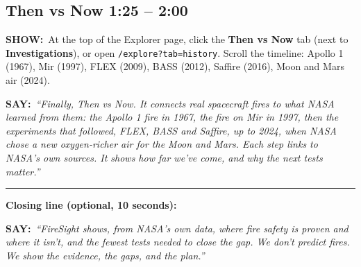 \documentclass[11pt,a4paper]{article}
\newcommand{\showit}[1]{\par\textbf{\color{showc}SHOW:}\ #1\par}
\newcommand{\sayit}[1]{\par\textbf{\color{sayc}SAY:}\ \textit{``#1''}\par\medskip}
\newcommand{\step}[2]{\subsection{#1 \hfill\normalsize\color{muted}#2}}
\begin{document}
\step{Then vs Now}{1:25 -- 2:00}
\showit{At the top of the Explorer page, click the \textbf{Then vs Now} tab (next to \textbf{Investigations}), or open \texttt{/explore?tab=history}. Scroll the timeline: Apollo 1 (1967), Mir (1997), FLEX (2009), BASS (2012), Saffire (2016), Moon and Mars air (2024).}
\sayit{Finally, Then vs Now. It connects real spacecraft fires to what NASA learned from them: the Apollo 1 fire in 1967, the fire on Mir in 1997, then the experiments that followed, FLEX, BASS and Saffire, up to 2024, when NASA chose a new oxygen-richer air for the Moon and Mars. Each step links to NASA's own sources. It shows how far we've come, and why the next tests matter.}

\medskip
\hrule
\medskip
\textbf{Closing line (optional, 10 seconds):}
\sayit{FireSight shows, from NASA's own data, where fire safety is proven and where it isn't, and the fewest tests needed to close the gap. We don't predict fires. We show the evidence, the gaps, and the plan.}
\end{document}
